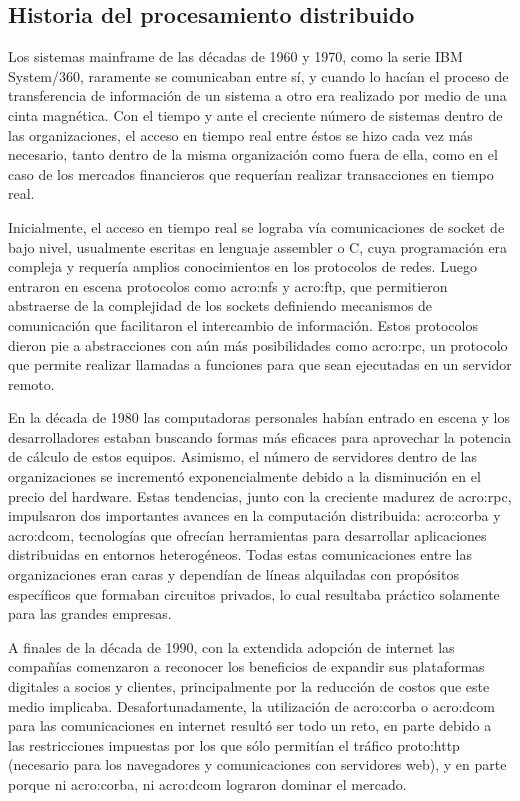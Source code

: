 \subsection{Historia del procesamiento distribuido}
\label{soa:historia}

Los sistemas mainframe de las décadas de 1960 y 1970, como la serie IBM System/360, raramente se comunicaban entre sí, y cuando lo hacían el proceso de transferencia de información de un sistema a otro era realizado por medio de una cinta magnética. Con el tiempo y ante el creciente número de sistemas dentro de las organizaciones, el acceso en tiempo real entre éstos se hizo cada vez más necesario, tanto dentro de la misma organización como fuera de ella, como en el caso de los mercados financieros que requerían realizar transacciones en tiempo real.

Inicialmente, el acceso en tiempo real se lograba vía comunicaciones de socket de bajo nivel, usualmente escritas en lenguaje assembler o C, cuya programación era compleja y requería amplios conocimientos en los protocolos de redes. Luego entraron en escena protocolos como \gls{acro:nfs} y \gls{acro:ftp}, que permitieron abstraerse de la complejidad de los sockets definiendo mecanismos de comunicación que facilitaron el intercambio de información. Estos protocolos dieron pie a abstracciones con aún más posibilidades como \gls{acro:rpc}, un protocolo que permite realizar llamadas a funciones para que sean ejecutadas en un servidor remoto.

En la década de 1980 las computadoras personales habían entrado en escena y los desarrolladores estaban buscando formas más eficaces para aprovechar la potencia de cálculo de estos equipos. Asimismo, el número de servidores dentro de las organizaciones se incrementó exponencialmente debido a la disminución en el precio del hardware. Estas tendencias, junto con la creciente madurez de \gls{acro:rpc}, impulsaron dos importantes avances en la computación distribuida: \gls{acro:corba} y \gls{acro:dcom}, tecnologías que ofrecían herramientas para desarrollar aplicaciones distribuidas en entornos heterogéneos. Todas estas comunicaciones entre las organizaciones eran caras y dependían de líneas alquiladas con propósitos específicos que formaban circuitos privados, lo cual resultaba práctico solamente para las grandes empresas.

A finales de la década de 1990, con la extendida adopción de internet las compañías comenzaron a reconocer los beneficios de expandir sus plataformas digitales a socios y clientes, principalmente por la reducción de costos que este medio implicaba. Desafortunadamente, la utilización de \gls{acro:corba} o \gls{acro:dcom} para las comunicaciones en internet resultó ser todo un reto, en parte debido a las restricciones impuestas por los  que sólo permitían el tráfico \gls{proto:http} (necesario para los navegadores y comunicaciones con servidores web), y en parte porque ni \gls{acro:corba}, ni \gls{acro:dcom} lograron dominar el mercado.


